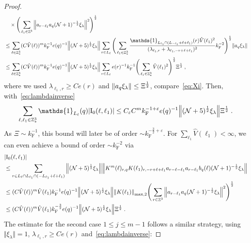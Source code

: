 \documentclass[12pt,a4paper]{article}
\numberwithin{equation}{section}
\newcommand{\1}{\mathbb{I}}
\newcommand{\F}{\mathrm{F}}
\newcommand{\I}{\mathrm{I}}
\newcommand{\Z}{\mathbb{Z}}
\newcommand{\NN}{\mathcal{N}}
\newcommand{\half}{\frac{1}{2}}
\theoremstyle{plain}
\theoremstyle{definition}
\theoremstyle{remark}
\theoremstyle{plain}
\theoremstyle{definition}
\theoremstyle{remark}
\begin{document}
\begin{proof}
\begin{align}
	 &\quad \times \Bigg( \sum\limits_{\ell_1 \in \Z^3} \norm{ a_{r-\ell_1} a_q (\NN+1)^{-\half} \xi_\lambda }^2 \Bigg)^\half \nonumber\\
	 &\leq \sum_{\ell \in \Z^3_*} (C \hat{V}(\ell))^m k_{\F}^{-1} e(q)^{-1}
	 	\norm{ (\NN+5)^{\half} \xi_\lambda}
	 	\sum_{r \in L_\ell} \Bigg( \sum_{\ell_1 \in \Z^3_*} \frac{\mathds{1}_{L_{\ell_1} \cap (L_{-\ell_1}+\ell+\ell_1)}(r) \hat{V}(\ell_1)^2}{(\lambda_{\ell_1,r} + \lambda_{\ell_1,-r+\ell+\ell_1})^2} k_{\F}^{-2} \Bigg)^{\half} \norm{ a_q \xi_\lambda } \nonumber\\
	 &\leq \sum_{\ell \in \Z^3_*} (C \hat{V}(\ell))^m k_{\F}^{-1} e(q)^{-1}
	 	\norm{ (\NN+5)^{\half} \xi_\lambda}
	 	\sum_{r \in L_\ell} e(r)^{-1} k_{\F}^{-1} \Bigg( \sum_{\ell_1 \in \Z^3_*} \hat{V}(\ell_1)^2 \Bigg)^{\half} \Xi^\half \;,
\end{align}
where we used $ \lambda_{\ell_1,r} \ge C e(r) $ and $ \norm{ a_q \xi_\lambda} \le \Xi^\half $, compare~\eqref{eq:Xi}. Then, with~\eqref{eq:lambdainverse}
\begin{align}
	\sum_{\ell,\ell_1 \in \Z^3_*} \mathds{1}_{L_\ell}(q) |\I_0(\ell, \ell_1)|
	\leq C_\varepsilon C^m k_{\F}^{-1+\varepsilon} e(q)^{-1}
	 	\norm{ (\NN+5)^{\half} \xi_\lambda}
	 	\Xi^{\half}	\;.
\label{eq:estEQ1121_Coulomb}
\end{align}
As $ \Xi \sim k_{\F}^{-1} $, this bound will later be of order $ \sim k_{\F}^{-\frac 32 + \varepsilon} $. For $ \sum_{\ell_1} \hat{V}(\ell_1) < \infty $, we can even achieve a bound of order $ \sim k_{\F}^{-2} $ via
\begin{align}
	&|\I_0(\ell, \ell_1)| \nonumber\\
	&\leq \sum\limits_{r\in L_{\ell} \cap L_{\ell_1}\cap (-L_{\ell_1}+\ell+\ell_1)}
		\norm{ (\NN+5)^{\half} \xi_\lambda} 
		\norm{ K^m(\ell )_{r,q} K(\ell_1)_{r,-r+\ell+\ell_1} a_{r-\ell-\ell_1} a_{r-\ell_1} b_{q}(\ell) (\NN+1)^{-\half} \xi_\lambda }\nonumber\\
	 &\leq (C \hat{V}(\ell))^m \hat{V}(\ell_1) k_{\F}^{-1} e(q)^{-1}
	 	\norm{ (\NN+5)^{\half} \xi_\lambda} \norm{K(\ell_1) }_{\max,2}
	 	\Bigg( \sum\limits_{r\in \Z^3} \norm{ a_{r-\ell_1} a_q (\NN+1)^{-\half} \xi_\lambda }^2 \Bigg)^\half \nonumber\\
	 &\leq (C \hat{V}(\ell))^m \hat{V}(\ell_1)
	 	k_{\F}^{-\frac 32} e(q)^{-1}
	 	\norm{(\NN+5)^{\half} \xi_\lambda}
	 	\Xi^{\half} \;.
\label{eq:estEQ1121}
\end{align}
The estimate for the second case $ 1 \le j \le m-1 $ follows a similar strategy, using $ \Vert \xi_\lambda \Vert = 1 $, $ \lambda_{\ell_1,r} \ge C e(r) $ and~\eqref{eq:lambdainverse}:

\end{proof}
\end{document}

